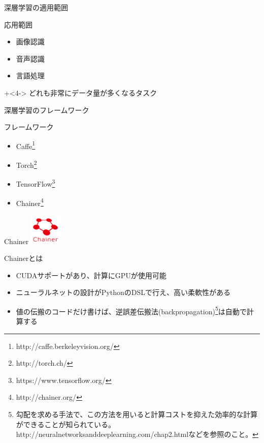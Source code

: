 \documentclass[12pt, unicode]{beamer}
\begin{document}
\begin{frame}{深層学習の適用範囲}
\begin{block}{応用範囲}
\begin{itemize}
\item<1-> 画像認識
\item<2-> 音声認識
\item<3-> 言語処理
\end{itemize}
\end{block}
\onslide+<4-> どれも非常にデータ量が多くなるタスク
\end{frame}

\begin{frame}{深層学習のフレームワーク}
\begin{block}{フレームワーク}
\begin{itemize}
\item Caffe\footnote[frame]{http://caffe.berkeleyvision.org/}
\item Torch\footnote[frame]{http://torch.ch/}
\item TensorFlow\footnote[frame]{https://www.tensorflow.org/}
\item Chainer\footnote[frame]{http://chainer.org/}
\end{itemize}
\end{block}
\end{frame}

\begin{frame}{Chainer}
\includegraphics[clip,width=1.5cm]{image/chainer_logo.png}
\begin{block}{Chainerとは}
\begin{itemize}
\item CUDAサポートがあり、計算にGPUが使用可能
\item ニューラルネットの設計がPythonのDSLで行え、高い柔軟性がある
\item 値の伝搬のコードだけ書けば、逆誤差伝搬法(backpropagation)\footnote[frame]{勾配を求める手法で、この方法を用いると計算コストを抑えた効率的な計算ができることが知られている。http://neuralnetworksanddeeplearning.com/chap2.htmlなどを参照のこと。}は自動で計算する
\end{itemize}
\end{block}
\end{frame}
\end{document}
